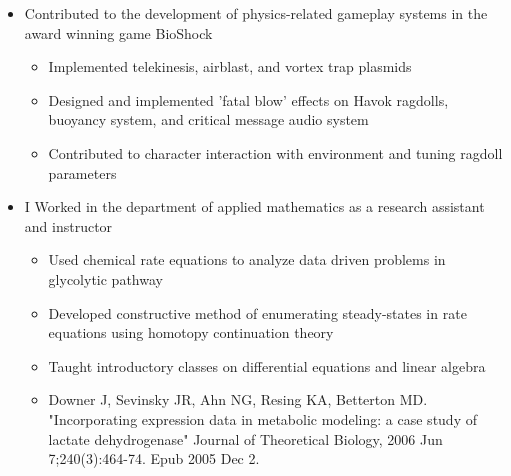 \documentclass[11pt,a4paper,sans]{moderncv}        %
\begin{document}
\vspace{6pt}

\begin{itemize}

\item{}

  Contributed to the development of physics-related gameplay systems in the
  award winning game BioShock

  \begin{itemize}
    \item{Implemented telekinesis, airblast, and vortex trap plasmids}
    \item{Designed and implemented 'fatal blow' effects on Havok ragdolls, buoyancy system, and critical message audio system}
    \item{Contributed to character interaction with environment and tuning ragdoll parameters}
  \end{itemize}

\end{itemize}


\vspace{6pt}

\begin{itemize}

\item{}

  I Worked in the department of applied mathematics as a research assistant and instructor

  \begin{itemize}
    \item{Used chemical rate equations to analyze data driven problems in glycolytic pathway}
    \item{Developed constructive method of enumerating steady-states in rate equations using homotopy continuation theory}
    \item{Taught introductory classes on differential equations and linear algebra}
    \item{Downer J, Sevinsky JR, Ahn NG, Resing KA, Betterton MD. "Incorporating expression data in metabolic modeling: a case study of lactate dehydrogenase" Journal of Theoretical Biology, 2006 Jun 7;240(3):464-74. Epub 2005 Dec 2.}
  \end{itemize}

\end{itemize}
\end{document}
